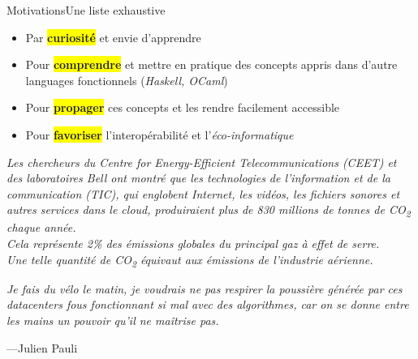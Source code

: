 \begin{frame}{Motivations}{Une liste exhaustive}
    \begin{itemize}[<+->]
        \item Par \colorbox{yellow}{\textbf{curiosité}} et envie d'apprendre
        \item Pour \colorbox{yellow}{\textbf{comprendre}} et mettre en pratique
        des concepts appris dans d'autre languages fonctionnels (\textit{Haskell, OCaml})
        \item Pour \colorbox{yellow}{\textbf{propager}} ces concepts et les rendre facilement accessible
        \item Pour \colorbox{yellow}{\textbf{favoriser}} l'interopérabilité et l'\textit{éco-informatique}
    \end{itemize}
\end{frame}

\begin{frame}
    \begin{flushleft}
        \textit{
            Les chercheurs du Centre for Energy-Efficient Telecommunications (CEET) et des laboratoires Bell ont montré que
            les technologies de l'information et de la communication (TIC), qui englobent Internet, les vidéos, les fichiers sonores
            et autres services dans le cloud, produiraient plus de 830 millions de tonnes de CO\textsubscript{2} chaque année.\\
            \bigskip
            Cela représente 2\% des émissions globales du principal gaz à effet de serre.\\
            \bigskip
            Une telle quantité de CO\textsubscript{2} équivaut aux émissions de l'industrie aérienne.
        }
    \end{flushleft}

\end{frame}

\begin{frame}
    \begin{flushleft}
        \textit{
            Je fais du vélo le matin, je voudrais ne pas respirer la poussière générée
            par ces datacenters fous fonctionnant si mal avec des algorithmes,
            car on se donne entre les mains un pouvoir qu'il ne maîtrise pas.
        }
        \begin{flushright}
            \tiny{---Julien Pauli}
        \end{flushright}
    \end{flushleft}

\end{frame}

